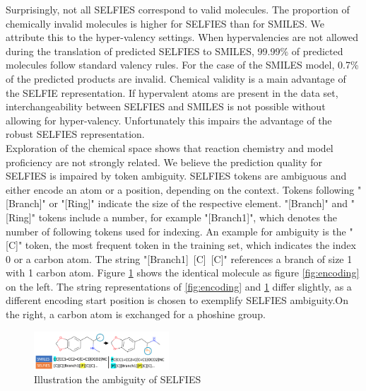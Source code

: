 \documentclass[10pt,conference,compsocconf]{IEEEtran}
\begin{document}
Surprisingly, not all SELFIES correspond to valid molecules. The proportion of chemically invalid molecules is higher for SELFIES than for SMILES. We attribute this to the hyper-valency settings. When hypervalencies are not allowed during the translation of predicted SELFIES to SMILES, 99.99\% of predicted molecules follow standard valency rules. For the case of the SMILES model, 0.7\% of the predicted products are invalid. Chemical validity is a main advantage of the SELFIE representation. If hypervalent atoms are present in the data set, interchangeability between SELFIES and SMILES is not possible without allowing for hyper-valency. Unfortunately this impairs the advantage of the robust SELFIES representation.\\

Exploration of the chemical space shows that reaction chemistry and model proficiency are not strongly related. We believe the prediction quality for SELFIES is impaired by token ambiguity. SELFIES tokens are ambiguous and either encode an atom or a position, depending on the context. Tokens following "[Branch]" or "[Ring]" indicate the size of the respective element. "[Branch]" and "[Ring]" tokens include a number, for example "[Branch1]", which denotes the number of following tokens used for indexing. An example for ambiguity is the "[C]" token, the most frequent token in the training set, which indicates the index 0 or a carbon atom. The string "[Branch1]~[C]~[C]" references a branch of size 1 with 1 carbon atom. Figure \ref{fig:SELFIESbad} shows the identical molecule as figure \ref{fig:encoding} on the left. The string representations of \ref{fig:encoding} and \ref{fig:SELFIESbad} differ slightly, as a different encoding start position is chosen to exemplify SELFIES ambiguity.\footnotemark On the right, a carbon atom is exchanged for a phoshine group.\\

\begin{figure}[h!]
  \includegraphics[width=0.45\textwidth]{figures/encode_C_P.png}
  \caption[]{Illustration the ambiguity of SELFIES}
  \label{fig:SELFIESbad}
\end{figure}
\end{document}

